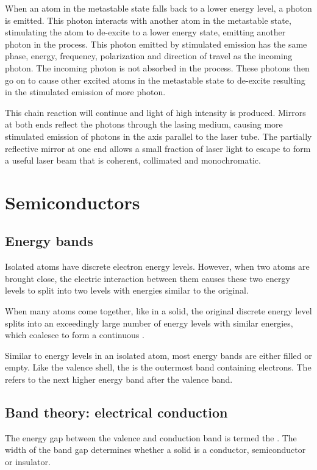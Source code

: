 \documentclass[Physics.tex]{subfiles}
\begin{document}
When an atom in the metastable state falls back to a lower energy level, a photon is emitted. This photon interacts with another atom in the metastable state, stimulating the atom to de-excite to a lower energy state, emitting another photon in the process. This photon emitted by stimulated emission has the same phase, energy, frequency, polarization and direction of travel as the incoming photon. The incoming photon is not absorbed in the process. These photons then go on to cause other excited atoms in the metastable state to de-excite resulting in the stimulated emission of more photon.

This chain reaction will continue and light of high intensity is produced. Mirrors at both ends reflect the photons through the lasing medium, causing more stimulated emission of photons in the axis parallel to the laser tube. The partially reflective mirror at one end allows a small fraction of laser light to escape to form a useful laser beam that is coherent, collimated and monochromatic.
\section{Semiconductors}
\subsection{Energy bands}
Isolated atoms have discrete electron energy levels. However, when two atoms are brought close, the electric interaction between them causes these two energy levels to split into two levels with energies similar to the original.

When many atoms come together, like in a solid, the original discrete energy level splits into an exceedingly large number of energy levels with similar energies, which coalesce to form a continuous . 

Similar to energy levels in an isolated atom, most energy bands are either filled or empty. Like the valence shell, the  is the outermost band containing electrons. The  refers to the next higher energy band after the valence band.
\subsection{Band theory: electrical conduction}
The energy gap between the valence and conduction band is termed the . The width of the band gap determines whether a solid is a conductor, semiconductor or insulator.
\end{document}
